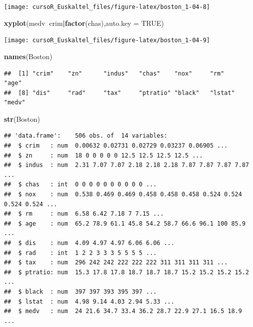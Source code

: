 \documentclass[]{book}
\newenvironment{Shaded}{\begin{snugshade}}{\end{snugshade}}
\newcommand{\KeywordTok}[1]{\textcolor[rgb]{0.13,0.29,0.53}{\textbf{#1}}}
\newcommand{\DataTypeTok}[1]{\textcolor[rgb]{0.13,0.29,0.53}{#1}}
\newcommand{\OtherTok}[1]{\textcolor[rgb]{0.56,0.35,0.01}{#1}}
\newcommand{\OperatorTok}[1]{\textcolor[rgb]{0.81,0.36,0.00}{\textbf{#1}}}
\newcommand{\NormalTok}[1]{#1}
\begin{document}
\begin{center}\texttt{[image: cursoR\_Euskaltel\_files/figure-latex/boston\_1-04-8]} \end{center}

\begin{Shaded}
\begin{Highlighting}[]
\KeywordTok{xyplot}\NormalTok{(medv}\OperatorTok{~}\NormalTok{crim}\OperatorTok{|}\KeywordTok{factor}\NormalTok{(chas),}\DataTypeTok{auto.key =} \OtherTok{TRUE}\NormalTok{)}
\end{Highlighting}
\end{Shaded}

\begin{center}\texttt{[image: cursoR\_Euskaltel\_files/figure-latex/boston\_1-04-9]} \end{center}

\begin{Shaded}
\begin{Highlighting}[]
\KeywordTok{names}\NormalTok{(Boston)}
\end{Highlighting}
\end{Shaded}

\begin{verbatim}
##  [1] "crim"    "zn"      "indus"   "chas"    "nox"     "rm"      "age"    
##  [8] "dis"     "rad"     "tax"     "ptratio" "black"   "lstat"   "medv"
\end{verbatim}

\begin{Shaded}
\begin{Highlighting}[]
\KeywordTok{str}\NormalTok{(Boston)}
\end{Highlighting}
\end{Shaded}

\begin{verbatim}
## 'data.frame':    506 obs. of  14 variables:
##  $ crim   : num  0.00632 0.02731 0.02729 0.03237 0.06905 ...
##  $ zn     : num  18 0 0 0 0 0 12.5 12.5 12.5 12.5 ...
##  $ indus  : num  2.31 7.07 7.07 2.18 2.18 2.18 7.87 7.87 7.87 7.87 ...
##  $ chas   : int  0 0 0 0 0 0 0 0 0 0 ...
##  $ nox    : num  0.538 0.469 0.469 0.458 0.458 0.458 0.524 0.524 0.524 0.524 ...
##  $ rm     : num  6.58 6.42 7.18 7 7.15 ...
##  $ age    : num  65.2 78.9 61.1 45.8 54.2 58.7 66.6 96.1 100 85.9 ...
##  $ dis    : num  4.09 4.97 4.97 6.06 6.06 ...
##  $ rad    : int  1 2 2 3 3 3 5 5 5 5 ...
##  $ tax    : num  296 242 242 222 222 222 311 311 311 311 ...
##  $ ptratio: num  15.3 17.8 17.8 18.7 18.7 18.7 15.2 15.2 15.2 15.2 ...
##  $ black  : num  397 397 393 395 397 ...
##  $ lstat  : num  4.98 9.14 4.03 2.94 5.33 ...
##  $ medv   : num  24 21.6 34.7 33.4 36.2 28.7 22.9 27.1 16.5 18.9 ...
\end{verbatim}
\end{document}
